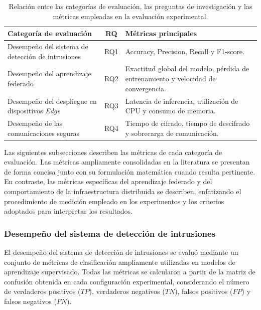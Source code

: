 \documentclass[journal,article,submit,moreauthors]{Definitions/mdpi}
\begin{document}
\begin{table}[ht]
\centering
\caption{Relación entre las categorías de evaluación, las preguntas de investigación y las métricas empleadas en la evaluación experimental.}
\label{tab:metrics_mapping}
\footnotesize

\begin{tabularx}{\columnwidth}{p{3.5cm} c X}
\toprule
\textbf{Categoría de evaluación} & \textbf{RQ} & \textbf{Métricas principales} \\
\midrule

Desempeño del sistema de detección de intrusiones &  RQ1 & Accuracy, Precision, Recall y F1-score. \\

Desempeño del aprendizaje federado & RQ2 & Exactitud global del modelo, pérdida de entrenamiento y velocidad de convergencia. \\

Desempeño del despliegue en dispositivos \textit{Edge} & RQ3 & Latencia de inferencia, utilización de CPU y consumo de memoria. \\

Desempeño de las comunicaciones seguras & RQ4 & Tiempo de cifrado, tiempo de descifrado y sobrecarga de comunicación. \\

\bottomrule
\end{tabularx}
\end{table}

Las siguientes subsecciones describen las métricas de cada categoría de evaluación. Las métricas ampliamente consolidadas en la literatura se presentan de forma concisa junto con su formulación matemática cuando resulta pertinente. En contraste, las métricas específicas del aprendizaje federado y del comportamiento de la infraestructura distribuida se describen, enfatizando el procedimiento de medición empleado en los experimentos y los criterios adoptados para interpretar los resultados.

\subsubsection{Desempeño del sistema de detección de intrusiones}
El desempeño del sistema de detección de intrusiones se evaluó mediante un conjunto de métricas de clasificación ampliamente utilizadas en modelos de aprendizaje supervisado. Todas las métricas se calcularon a partir de la matriz de confusión obtenida en cada configuración experimental, considerando el número de verdaderos positivos ($TP$), verdaderos negativos ($TN$), falsos positivos ($FP$) y falsos negativos ($FN$).
\end{document}
